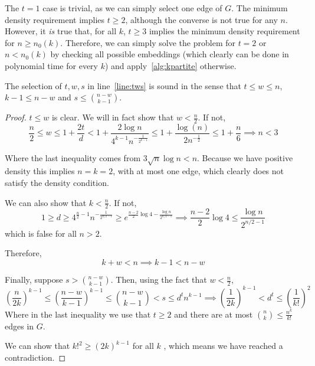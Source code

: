 \begin{remark} %
    The $t=1$ case is trivial, as we can simply select one edge of $G$.
    The minimum density requirement implies $t \geq 2$, although the converse is not true for any $n$.
    However, it \emph{is} true that, for all $k$, $t \geq 3$ implies the minimum density requirement
    for $n \geq n_0(k)$.
    Therefore, we can simply solve the problem for $t = 2$ or $n < n_0(k)$
    by checking all possible embeddings
    (which clearly can be done in polynomial time for every $k$)
    and apply~\ref{alg:kpartite} otherwise.
\end{remark}

\begin{lemma}
    The selection of $t, w, s$ in line~\ref{line:tws} is sound in the sense that
    $t  \leq w \leq n$, $k - 1 \leq n - w$ and $s \leq \binom{n - w}{k - 1}$.
    \begin{proof}
        $t \leq w$ is clear.
        We will in fact show that $w < \frac{n}{2}$.
        If not,
        \[
            \frac{n}{2} \leq
            w \leq 1 + \frac{2t}{d} <
            1 + \frac{2 \log n}{4^{k-1} n^{-\frac{1}{2^{k-1}}}} \leq
            1 + \frac{\log(n)}{2 n^{-\frac{1}{2}}} \leq
            1 + \frac{n}{6} \implies n < 3
        \]

        Where the last inequality comes from $3 \sqrt {n} \log n < n$.
        Because we have positive density this implies $n = k = 2$,
        with at most one edge, which clearly
        does not satisfy the density condition.

        We can also show that $k < \frac{n}{2}$.
        If not,
        \[
            1 \geq
            d \geq
            4^{\frac{n}{2}-1} n^{-\frac{1}{2^{n/2-1}}} \geq
            e^{\frac{n-2}{2} \log 4 - \frac{\log n}{2^{n/2-1}}} \implies
            \frac{n-2}{2} \log 4 \leq \frac{\log n}{2^{n/2-1}}
        \]
        which is false for all $n > 2$. %

        Therefore,
        \[
            k + w < n \implies k - 1 < n - w
        \]

        Finally, suppose $s > \binom{n - w}{k - 1}$.
        Then, using the fact that $w < \frac{n}{2}$,
        \[
            \left( \frac{n}{2k} \right)^{k-1} \leq
            \left( \frac{n-w}{k-1} \right)^{k-1} \leq
            \binom{n - w}{k - 1} < s \leq d^t n^{k-1}
            \implies  \left( \frac{1}{2k} \right)^{k-1} < d^t \leq
            \left( \frac{1}{k!} \right)^2
        \]
        Where in the last inequality we use that $t \geq 2$ and there are at most
        $\binom{n}{k} \leq \frac{n^k}{k!}$ edges in $G$.

        We can show that $k!^2 \geq (2k)^{k-1}$ for all $k$ %
        , which means we have reached a contradiction. \qedhere

    \end{proof}
\end{lemma}


